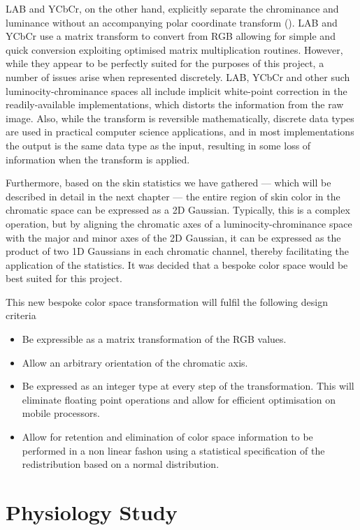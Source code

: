 LAB and YCbCr, on the other hand, explicitly separate the chrominance and luminance without an accompanying polar coordinate transform (\cite{Vezhnevets2003,Poynton1997,Phung2002a}). LAB and YCbCr use a matrix transform to convert from RGB  allowing for simple and quick conversion exploiting optimised matrix multiplication routines. However, while they appear to be perfectly suited for the purposes of this project, a number of issues arise when represented discretely. LAB, YCbCr and other such luminocity-chrominance spaces all include implicit white-point correction in the readily-available implementations, which distorts the information from the raw image. Also, while the transform is reversible mathematically, discrete data types are used in practical computer science applications, and in most implementations the output is the same data type as the input, resulting in some loss of information when the transform is applied.

Furthermore, based on the skin statistics we have gathered --- which will be described in detail in the next chapter --- the entire region of skin color in the chromatic space can be expressed as a 2D Gaussian. Typically, this is a complex operation, but by aligning the chromatic axes of a luminocity-chrominance space with the major and minor axes of the 2D Gaussian, it can be expressed as the product of two 1D Gaussians in each chromatic channel, thereby facilitating the application of the statistics. It was decided that a bespoke color space would be best suited for this project. 

This new bespoke color space transformation will fulfil the following design criteria
\begin{itemize}
\item Be expressible as a matrix transformation of the RGB values.
\item Allow an arbitrary orientation of the chromatic axis.
\item Be expressed as an integer type at every step of the transformation. This will eliminate floating point operations and allow for efficient optimisation on mobile processors.
\item Allow for retention and elimination of color space information to be performed in a non linear fashon using a statistical specification of the redistribution based on a normal distribution.
\end{itemize}


\section{Physiology Study}\label{sec:PhysiologyStudy}

